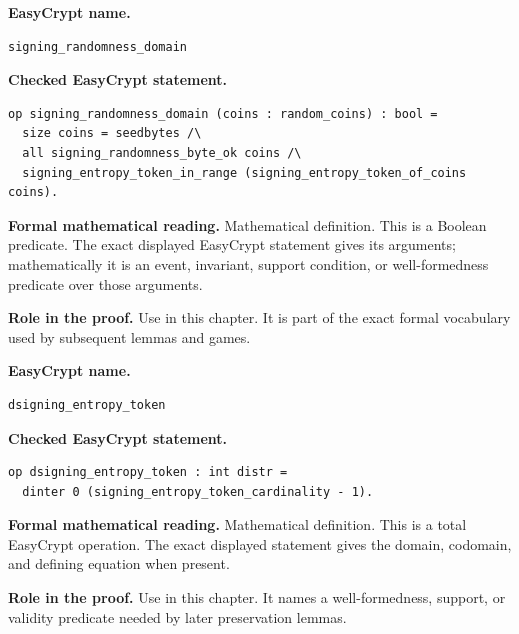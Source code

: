 \begin{formaldefinition}
\noindent\textbf{EasyCrypt name.}
\begin{lstlisting}[language=EasyCrypt,basicstyle=\ttfamily\scriptsize]
signing_randomness_domain
\end{lstlisting}
\noindent\textbf{Checked EasyCrypt statement.}
\begin{lstlisting}[language=EasyCrypt,basicstyle=\ttfamily\scriptsize]
op signing_randomness_domain (coins : random_coins) : bool =
  size coins = seedbytes /\
  all signing_randomness_byte_ok coins /\
  signing_entropy_token_in_range (signing_entropy_token_of_coins coins).
\end{lstlisting}
\noindent\textbf{Formal mathematical reading.}
Mathematical definition. This is a Boolean predicate.  The exact displayed EasyCrypt statement gives its arguments; mathematically it is an event, invariant, support condition, or well-formedness predicate over those arguments.

\noindent\textbf{Role in the proof.}
Use in this chapter. It is part of the exact formal vocabulary used by subsequent lemmas and games.

\end{formaldefinition}

\begin{formaldefinition}
\noindent\textbf{EasyCrypt name.}
\begin{lstlisting}[language=EasyCrypt,basicstyle=\ttfamily\scriptsize]
dsigning_entropy_token
\end{lstlisting}
\noindent\textbf{Checked EasyCrypt statement.}
\begin{lstlisting}[language=EasyCrypt,basicstyle=\ttfamily\scriptsize]
op dsigning_entropy_token : int distr =
  dinter 0 (signing_entropy_token_cardinality - 1).
\end{lstlisting}
\noindent\textbf{Formal mathematical reading.}
Mathematical definition. This is a total EasyCrypt operation.  The exact displayed statement gives the domain, codomain, and defining equation when present.

\noindent\textbf{Role in the proof.}
Use in this chapter. It names a well-formedness, support, or validity predicate needed by later preservation lemmas.

\end{formaldefinition}


